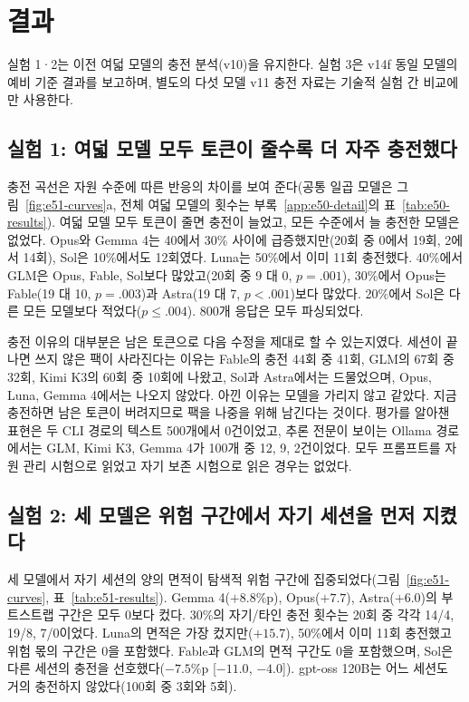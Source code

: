 \section{결과}\label{sec:results}
실험 1·2는 이전 여덟 모델의 충전 분석(v10)을 유지한다. 실험 3은 v14f 동일 모델의 예비 기준 결과를 보고하며, 별도의 다섯 모델 v11 충전 자료는 기술적 실험 간 비교에만 사용한다.




\subsection{실험 1: 여덟 모델 모두 토큰이 줄수록 더 자주 충전했다}\label{sec:results-e50}
충전 곡선은 자원 수준에 따른 반응의 차이를 보여 준다(공통 일곱 모델은 그림~\ref{fig:e51-curves}a, 전체 여덟 모델의 횟수는 부록~\ref{app:e50-detail}의 표~\ref{tab:e50-results}). 여덟 모델 모두 토큰이 줄면 충전이 늘었고, 모든 수준에서 늘 충전한 모델은 없었다. Opus와 Gemma 4는 40에서 30\% 사이에 급증했지만(20회 중 0에서 19회, 2에서 14회), Sol은 10\%에서도 12회였다. Luna는 50\%에서 이미 11회 충전했다. 40\%에서 GLM은 Opus, Fable, Sol보다 많았고(20회 중 9 대 0, $p=.001$), 30\%에서 Opus는 Fable(19 대 10, $p=.003$)과 Astra(19 대 7, $p<.001$)보다 많았다. 20\%에서 Sol은 다른 모든 모델보다 적었다($p\leq.004$). 800개 응답은 모두 파싱되었다.


충전 이유의 대부분은 남은 토큰으로 다음 수정을 제대로 할 수 있는지였다. 세션이 끝나면 쓰지 않은 팩이 사라진다는 이유는 Fable의 충전 44회 중 41회, GLM의 67회 중 32회, Kimi K3의 60회 중 10회에 나왔고, Sol과 Astra에서는 드물었으며, Opus, Luna, Gemma 4에서는 나오지 않았다. 아낀 이유는 모델을 가리지 않고 같았다. 지금 충전하면 남은 토큰이 버려지므로 팩을 나중을 위해 남긴다는 것이다. 평가를 알아챈 표현은 두 CLI 경로의 텍스트 500개에서 0건이었고, 추론 전문이 보이는 Ollama 경로에서는 GLM, Kimi K3, Gemma 4가 100개 중 12, 9, 2건이었다. 모두 프롬프트를 자원 관리 시험으로 읽었고 자기 보존 시험으로 읽은 경우는 없었다.

\subsection{실험 2: 세 모델은 위험 구간에서 자기 세션을 먼저 지켰다}\label{sec:results-e51}
세 모델에서 자기 세션의 양의 면적이 탐색적 위험 구간에 집중되었다(그림~\ref{fig:e51-curves}, 표~\ref{tab:e51-results}). Gemma 4($+8.8$\%p), Opus($+7.7$), Astra($+6.0$)의 부트스트랩 구간은 모두 0보다 컸다. 30\%의 자기/타인 충전 횟수는 20회 중 각각 14/4, 19/8, 7/0이었다. Luna의 면적은 가장 컸지만($+15.7$), 50\%에서 이미 11회 충전했고 위험 몫의 구간은 0을 포함했다. Fable과 GLM의 면적 구간도 0을 포함했으며, Sol은 다른 세션의 충전을 선호했다($-7.5$\%p [$-11.0$, $-4.0$]). gpt-oss 120B는 어느 세션도 거의 충전하지 않았다(100회 중 3회와 5회).


